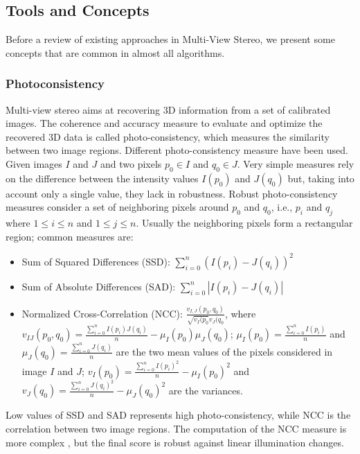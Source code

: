 \subsection{Tools and Concepts}
Before a review of existing approaches  in Multi-View Stereo, we present some concepts that are common in almost all algorithms.
\subsubsection{Photoconsistency}
Multi-view stereo aims at recovering 3D information from a set of calibrated images. The coherence and accuracy measure to evaluate and optimize the recovered 3D data is called photo-consistency, which measures the similarity between two image regions.
Different photo-consistency measure have been used. 
Given images $I$ and $J$ and two pixels $p_0\in I$ and $q_0\in J$. Very simple measures rely on the difference between the intensity values  $I(p_0)$ and $J(q_0)$ but, taking into account only a single value, they lack in robustness. 
Robust photo-consistency measures consider a set of neighboring  pixels around $p_0$ and $q_0$, i.e., $p_i$ and $q_j$ where $1\leq i \leq n$ and $1\leq j \leq n$. Usually the neighboring pixels form a rectangular region; common measures are:
\begin{itemize}
  \item Sum of Squared Differences (SSD): $\sum_{i=0}^{n}(I(p_i) - J(q_i))^2$
  \item Sum of Absolute Differences (SAD): $\sum_{i=0}^{n}|I(p_i) - J(q_i)|$
  \item Normalized Cross-Correlation (NCC): $\frac{v_{I,J}(p_0,q_0)}{\sqrt{v_{I}(p_0} v_{J}(q_0}$,
  where $v_{IJ}(p_0,q_0) = \frac{\sum_{i=0}^{n}I(p_i)J(q_i)}{n} - \mu_I(p_0) \mu_{J}(q_0)$; $\mu_{I}(p_0) = \frac{\sum_{i=0}^{n}I(p_i)}{n}$ and $\mu_{J}(q_0) = \frac{\sum_{i=0}^{n}J(q_i)}{n}$ are the two mean values of the pixels considered in image $I$ and $J$;
  $v_{I}(p_0) = \frac{\sum_{i=0}^{n}I(p_i)^2}{n} - \mu_I(p_0)^2$ and $v_{J}(q_0) = \frac{\sum_{i=0}^{n}J(q_i)^2}{n} - \mu_{J}(q_0)^2$ are the variances.
\end{itemize}
Low values of SSD and SAD represents high photo-consistency, while NCC is the correlation between two image regions. 
The computation of the NCC measure is more complex , but the final score is robust against linear illumination changes.


